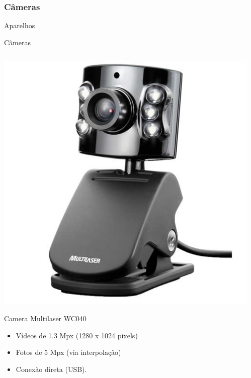 \documentclass{beamer}
\begin{document}
\subsubsection{Câmeras}

\begin{frame}{Aparelhos}

\begin{exampleblock}{}
   \begin{center}
    Câmeras    
   \end{center}
\end{exampleblock}   

\begin{columns}
\begin{column}{0.5\textwidth}
\begin{center}
\includegraphics[width=.56\textwidth]{img/slide_cam1.jpeg}   
\end{center}
Camera Multilaser WC040
\begin{itemize}\tiny
 \item Vídeos de 1.3 Mpx (1280 x 1024 pixels)
 \item Fotos de 5 Mpx (via interpolação) 
 \item Conexão direta (USB).
\end{itemize}
\end{column}
\begin{column}{0.5\textwidth}
\begin{center}


\end{center}
\end{column}
\end{columns}
\end{frame}
\end{document}
